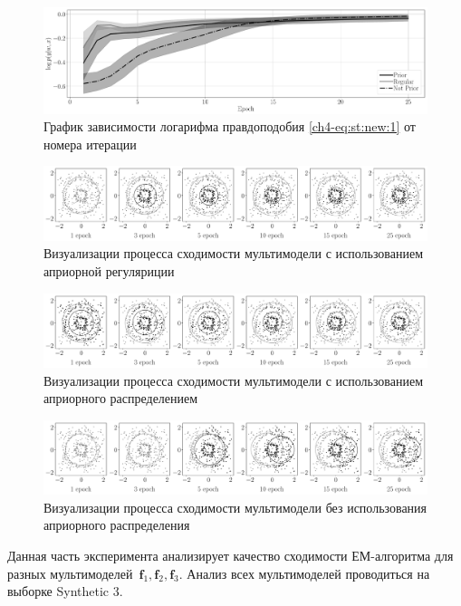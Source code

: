 \begin{figure}[!ht]\center
\includegraphics[width=1\textwidth]{results/priorexpert/experiment_synt_likelihood_progress}
\caption{График зависимости логарифма правдоподобия \eqref{ch4-eq:st:new:1} от номера итерации}
\label{ch4-experiment:st:2:2}
\end{figure}

\begin{figure}[!ht]\center
\includegraphics[width=1\textwidth]{results/priorexpert/experiment_synt_regular_progress}
\caption{Визуализации процесса сходимости мультимодели с использованием априорной регуляриции}
\label{ch4-experiment:st:2:3}
\end{figure}

\begin{figure}[!ht]\center
\includegraphics[width=1\textwidth]{results/priorexpert/experiment_synt_prior_progress}
\caption{Визуализации процесса сходимости мультимодели с использованием априорного распределением}
\label{ch4-experiment:st:2:4}
\end{figure}

\begin{figure}[!ht]\center
\includegraphics[width=1\textwidth]{results/priorexpert/experiment_synt_not_prior_progress}
\caption{Визуализации процесса сходимости мультимодели без использования априорного распределения}
\label{ch4-experiment:st:2:5}
\end{figure}
Данная часть эксперимента анализирует качество сходимости ЕМ-алгоритма для разных мультимоделей~$\textbf{f}_1, \textbf{f}_2, \textbf{f}_3$.
Анализ всех мультимоделей проводиться на выборке Synthetic 3.

